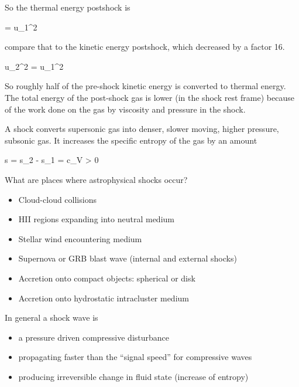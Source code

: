 So the thermal energy postshock is

\beq
{} =  u_1^2
\eeq

compare that to the kinetic energy postshock, which decreased by a
factor 16. 

\beq
{}u_2^2 = u_1^2 
\eeq

So roughly half of the pre-shock kinetic energy is converted to thermal energy. The total energy
of the post-shock gas is lower (in the shock rest frame) because of the work done on the gas by
viscosity and pressure in the shock.

A shock converts supersonic gas into denser, slower moving, higher pressure, subsonic gas. It
increases the specific entropy of the gas by an amount

\beq
\Delta s = s_2 - s_1 = c_V  > 0
\eeq

What are places where astrophysical shocks occur?

\begin{itemize}
\item Cloud-cloud collisions
\item HII regions expanding into neutral medium
\item Stellar wind encountering medium
\item Supernova or GRB blast wave (internal and external shocks)
\item Accretion onto compact objects: spherical or disk
\item Accretion onto hydrostatic intracluster medium
\end{itemize}

In general a shock wave is
\begin{itemize}
\item a pressure driven compressive disturbance
\item propagating faster than the “signal speed” for compressive waves
\item producing irreversible change in fluid state (increase of entropy)
\end{itemize}









